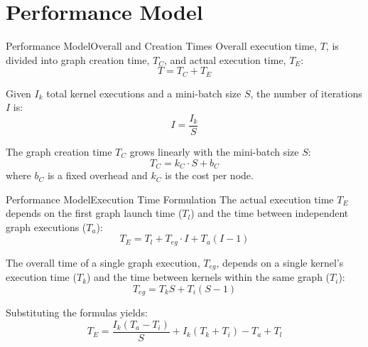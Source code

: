 \documentclass[10pt,aspectratio=43]{beamer}
\begin{document}
\section{Performance Model}
\begin{frame}{Performance Model}{Overall and Creation Times}
    Overall execution time, $T$, is divided into graph creation time, $T_C$, and actual execution time, $T_E$:
    \begin{equation}
        T = T_C + T_E
    \end{equation}
    
    Given $I_k$ total kernel executions and a mini-batch size $S$, the number of iterations $I$ is:
    \begin{equation}
        I = \frac{I_k}{S}
    \end{equation}
    
    The graph creation time $T_C$ grows linearly with the mini-batch size $S$:
    \begin{equation}
        T_C = k_C \cdot S + b_C
    \end{equation}
    where $b_C$ is a fixed overhead and $k_C$ is the cost per node.
\end{frame}

\begin{frame}{Performance Model}{Execution Time Formulation}
    The actual execution time $T_E$ depends on the first graph launch time ($T_l$) and the time between independent graph executions ($T_a$):
    \begin{equation}
        T_{E} = T_{l} + T_{eg}\cdot I + T_{a}(I-1)
    \end{equation}
    
    The overall time of a single graph execution, $T_{eg}$, depends on a single kernel's execution time ($T_k$) and the time between kernels within the same graph ($T_i$):
    \begin{equation}
        T_{eg} = T_{k}S + T_{i}(S-1)
    \end{equation}
    
    Substituting the formulas yields:
    \begin{equation}
        T_E = \frac{I_{k}(T_{a}-T_{i})}{S} + I_{k}(T_{k} + T_{i}) - T_{a} + T_{l}
    \end{equation}
\end{frame}
\end{document}
